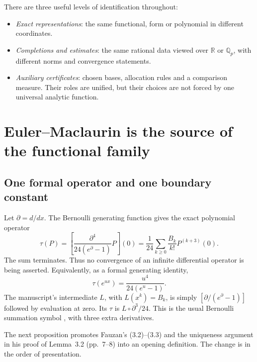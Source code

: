 \documentclass[11pt]{article}
\theoremstyle{definition}
\theoremstyle{remark}\newtheorem*{remark}{Remark}
\newcommand{\Q}{\mathbb Q}
\newcommand{\R}{\mathbb R}
\begin{document}
There are three useful levels of identification throughout:
\begin{itemize}
\item \emph{Exact representations}: the same functional, form or polynomial in
different coordinates.
\item \emph{Completions and estimates}: the same rational data viewed over
$\R$ or $\Q_p$, with different norms and convergence statements.
\item \emph{Auxiliary certificates}: chosen bases, allocation rules and a
comparison measure. Their roles are unified, but their choices are not forced
by one universal analytic function.
\end{itemize}

\section{Euler--Maclaurin is the source of the functional family}

\subsection{One formal operator and one boundary constant}
Let $\partial=d/dx$. The Bernoulli generating function gives the exact polynomial
operator
\begin{equation}\label{eq:EM}
 \tau(P)=\left[\frac{\partial^4}{24(e^\partial-1)}P\right](0)
 =\frac1{24}\sum_{k\ge0}\frac{B_k}{k!}P^{(k+3)}(0).
\end{equation}
The sum terminates. Thus no convergence of an infinite differential operator is
being asserted. Equivalently, as a formal generating identity,
\begin{equation}\label{eq:symbol}
 \tau(e^{ux})=\frac{u^4}{24(e^u-1)}.
\end{equation}
The manuscript's intermediate $L$, with $L(x^k)=B_k$, is simply
$[\partial/(e^\partial-1)]$ followed by evaluation at zero. Its $\tau$ is
$L\circ\partial^3/24$. This is the usual Bernoulli summation symbol
\cite{Bernoulli}, with three extra derivatives.

The next proposition promotes Fauzan's (3.2)--(3.3) and the uniqueness
argument in his proof of Lemma~3.2 (pp.~7--8) into an opening definition.
The change is in the order of presentation.
\end{document}
